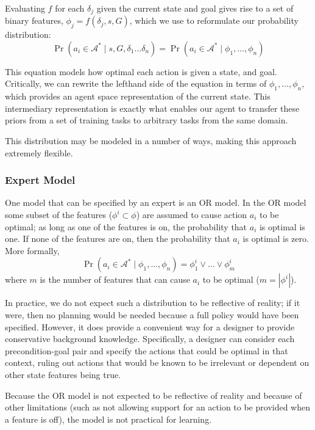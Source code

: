 \documentclass[11pt]{article}
\begin{document}
Evaluating $f$ for each $\delta_j$ given the current state and goal gives rise to a set of binary features,
$\phi_j = f(\delta_j, s, G)$, which we use to reformulate our probability distribution:
\begin{equation}
\Pr(a_i \in \mathcal{A}^*  \mid s, G, \delta_1 \ldots \delta_n) = \Pr(a_i \in \mathcal{A}^*  \mid \phi_1, \ldots, \phi_n)
\label{eq:master_eq}
\end{equation}

This equation models how optimal each action is given a state, and goal. Critically, we can rewrite the lefthand side of the equation in terms of $\phi_1, \ldots, \phi_n$, which provides an agent space representation of the current state. This intermediary representation is exactly what enables our agent to transfer these priors from a set of training tasks to arbitrary tasks from the same domain.

This distribution may be modeled in a number of ways, making this approach extremely flexible.

\subsubsection{Expert Model} One model that can be specified by
an expert is an OR model.
In the OR model some subset of the features 
($\phi^i \subset \phi$) are
assumed to cause action $a_i$ to be optimal; as long as one of
the features is on, the probability that $a_i$ is optimal is one.
If none of the features are on, then the probability that $a_i$ is 
optimal is zero. More formally,
\begin{equation}
\Pr(a_i \in \mathcal{A}^*  \mid \phi_1, \ldots, \phi_n) = \phi_1^i \lor ... \lor \phi_m^i
\end{equation}
where $m$ is the number of features that can cause $a_i$ to be optimal ($m = |\phi^i|$).

In practice, we do not expect such a distribution to be reflective of
reality; if it were, then no planning would be needed because a full
policy would have been specified. However, it does provide a
convenient way for a designer to provide conservative background
knowledge. Specifically, a designer can consider each precondition-goal
pair and specify the actions that could be optimal in that context, ruling
out actions that would be known to be irrelevant or dependent on other
state features being true.

Because the OR model is not expected to be reflective of
reality and because of other limitations (such as not allowing support
for an action to be provided when a feature is off), the model is not
practical for learning.
\end{document}
